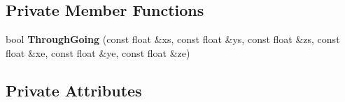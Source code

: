 \subsection*{Private Member Functions}
\begin{DoxyCompactItemize}
\item 
bool {\bfseries Through\+Going} (const float \&xs, const float \&ys, const float \&zs, const float \&xe, const float \&ye, const float \&ze)\hypertarget{classMuCSFlashMatch_a7eb5d8ee16d0da0844dd029c3ca8e03e}{}\label{classMuCSFlashMatch_a7eb5d8ee16d0da0844dd029c3ca8e03e}

\end{DoxyCompactItemize}
\subsection*{Private Attributes}
